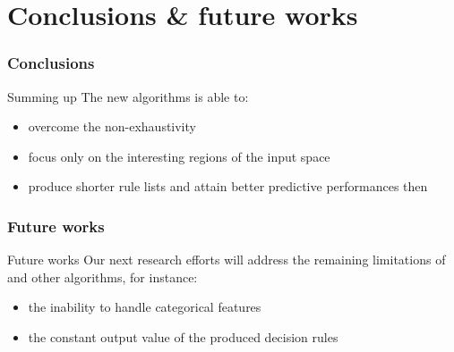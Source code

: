 \documentclass[presentation]{beamer}
\begin{document}
\section{Conclusions \& future works}

\begin{frame}%
\frametitle{Conclusions}

\begin{block}{Summing up}
	The new \gridex algorithms is able to:
    \begin{itemize}
        \item overcome the \iter non-exhaustivity
        \item focus only on the interesting regions of the input space
        \item produce shorter rule lists and attain better predictive performances then \iter
    \end{itemize}
\end{block}

\end{frame}

\begin{frame}
	\frametitle{Future works}

\begin{exampleblock}{Future works}
	Our next research efforts will address the remaining limitations of \iter and other algorithms, for instance:
    \begin{itemize}
        \item the inability to handle categorical features
        \item the constant output value of the produced decision rules 
    \end{itemize}
\end{exampleblock}

\end{frame}
\end{document}
